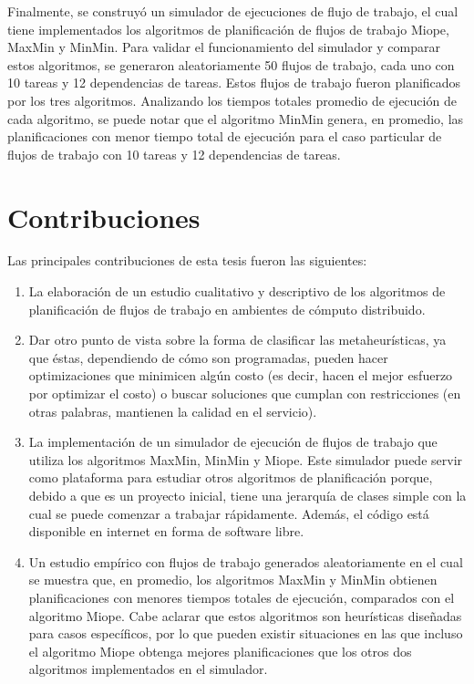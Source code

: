 Finalmente, se construyó un simulador de ejecuciones de flujo de trabajo, el cual tiene implementados los algoritmos de planificación de flujos de trabajo Miope, MaxMin y MinMin. Para validar el funcionamiento del simulador y comparar estos algoritmos, se generaron aleatoriamente 50 flujos de trabajo, cada uno con 10 tareas y 12 dependencias de tareas. Estos flujos de trabajo fueron planificados por los tres algoritmos. Analizando los tiempos totales promedio de ejecución de cada algoritmo, se puede notar que el algoritmo MinMin genera, en promedio, las planificaciones con menor tiempo total de ejecución para el caso particular de flujos de trabajo con 10 tareas y 12 dependencias de tareas.

\section{Contribuciones}
Las principales contribuciones de esta tesis fueron las siguientes:
\begin{enumerate}
\item La elaboración de un estudio cualitativo y descriptivo de los algoritmos de planificación de flujos de trabajo en ambientes de cómputo distribuido.
\item Dar otro punto de vista sobre la forma de clasificar las metaheurísticas, ya que éstas, dependiendo de cómo son programadas, pueden hacer optimizaciones que minimicen algún costo (es decir, hacen el mejor esfuerzo por optimizar el costo) o buscar soluciones que cumplan con restricciones (en otras palabras, mantienen la calidad en el servicio).
\item La implementación de un simulador de ejecución de flujos de trabajo que utiliza los algoritmos MaxMin, MinMin y Miope. Este simulador puede servir como plataforma para estudiar otros algoritmos de planificación porque, debido a que es un proyecto inicial, tiene una jerarquía de clases simple con la cual se puede comenzar a trabajar rápidamente. Además, el código está disponible en internet en forma de software libre.
\item Un estudio empírico con flujos de trabajo generados aleatoriamente en el cual se muestra que, en promedio, los algoritmos MaxMin y MinMin obtienen planificaciones con menores tiempos totales de ejecución, comparados con el algoritmo Miope. Cabe aclarar que estos algoritmos son heurísticas diseñadas para casos específicos, por lo que pueden existir situaciones en las que incluso el algoritmo Miope obtenga mejores planificaciones que los otros dos algoritmos implementados en el simulador.
\end{enumerate}

